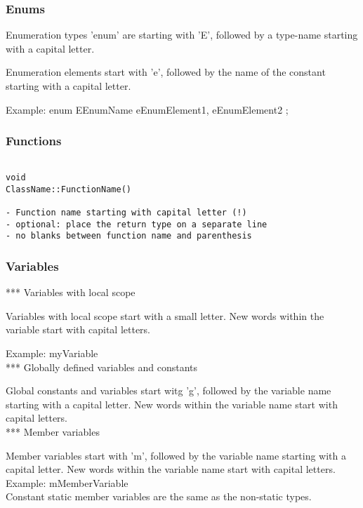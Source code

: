 \subsubsection{Enums}

Enumeration types 'enum' are starting with 'E', followed by a type-name starting with a capital letter.

Enumeration elements start with 'e', followed by the name of the constant starting with a capital letter.

Example:
enum EEnumName
{
    eEnumElement1,
    eEnumElement2
};

\subsubsection{Functions}
\begin{verbatim}

void 
ClassName::FunctionName()

- Function name starting with capital letter (!)
- optional: place the return type on a separate line 
- no blanks between function name and parenthesis

\end{verbatim}
\subsubsection{Variables}

*** Variables with local scope 

Variables with local scope start with a small letter. New words
within the variable start with capital letters.

Example: myVariable
\\

*** Globally defined variables and constants

Global constants and variables start witg 'g', followed by the
variable name starting with a capital letter. New words within the
variable name start with capital letters.
\\

*** Member variables

Member variables start with 'm', followed by the variable name
starting with a capital letter. New words within the variable name
start with capital letters.
\\

Example: mMemberVariable
\\

Constant static member variables are the same as the
non-static types. 
\\

